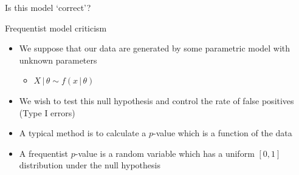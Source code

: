 \begin{frame}{Is this model `correct'?}
\begin{center}
  \end{center}
\end{frame}

\begin{frame}{Frequentist model criticism}
  \begin{itemize}
    \item We suppose that our data are generated by some parametric model with unknown parameters
    \begin{itemize}
      \item $X \,|\, \theta \sim f(x\,|\,\theta)$
    \end{itemize}
    \vspace{\baselineskip}
    \pause
    \item We wish to test this null hypothesis and control the rate of false positives (Type I errors)
    \vspace{\baselineskip}
    \pause
    \item A typical method is to calculate a $p$-value which is a function of the data
    \vspace{\baselineskip}
    \pause
    \item A frequentist $p$-value is a random variable which has a uniform $[0,1]$ distribution under the null hypothesis
  \end{itemize}
\end{frame}

